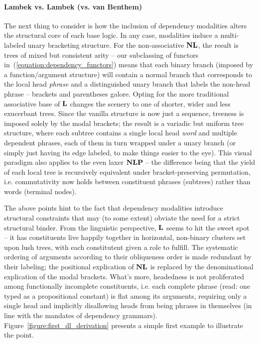 \paragraph{Lambek vs. Lambek (vs. van Benthem)}
The next thing to consider is how the inclusion of dependency modalities alters the structural core of each base logic.
In any case, modalities induce a multi-labeled unary bracketing structure.
For the non-associative $\textbf{NL}$, the result is trees of mixed but consistent arity -- our subclassing of functors in~(\ref{equation:dependency_functors}) means that each binary branch (imposed by a function/argument structure) will contain a normal branch that corresponds to the local head \textit{phrase} and a distinguished unary branch that labels the non-head phrase -- brackets and parentheses galore.
Opting for the more traditional associative base of $\textbf{L}$ changes the scenery to one of shorter, wider and less exucerbant trees.
Since the vanilla structure is now just a sequence, treeness is imposed solely by the modal brackets; the result is a variadic but uniform tree structure, where each subtree contains a single local head  \textit{word} and multiple dependent phrases, each of them in turn wrapped under a unary branch (or simply just having its edge labeled, to make things easier to the eye).
This visual paradigm also applies to the even laxer $\textbf{NLP}$ -- the difference being that the yield of each local tree is recursively equivalent under bracket-preserving permutation, i.e. commutativity now holds between constituent phrases (subtrees) rather than words (terminal nodes).

The above points hint to the fact that dependency modalities introduce structural constraints that may (to some extent) obviate the need for a strict structural binder.
From the linguistic perspective, $\textbf{L}$ seems to hit the sweet spot -- it has constituents live happily together in horizontal, non-binary clusters set upon lush trees, with each constitutent given a role to fulfill.
The systematic ordering of arguments according to their obliqueness order is made redundant by their labeling; the positional explication of $\textbf{NL}$ is replaced by the denominational explication of the modal brackets.
What's more, headedness is not proliferated among functionally incomplete constituents, i.e. each complete phrase (read: one typed as a propositional constant) is flat among its arguments, requiring only a single head and implicitly disallowing heads from being phrases in themselves (in line with the mandates of dependency grammars).
Figure~\ref{figure:first_dl_derivation} presents a simple first example to illustrate the point.

